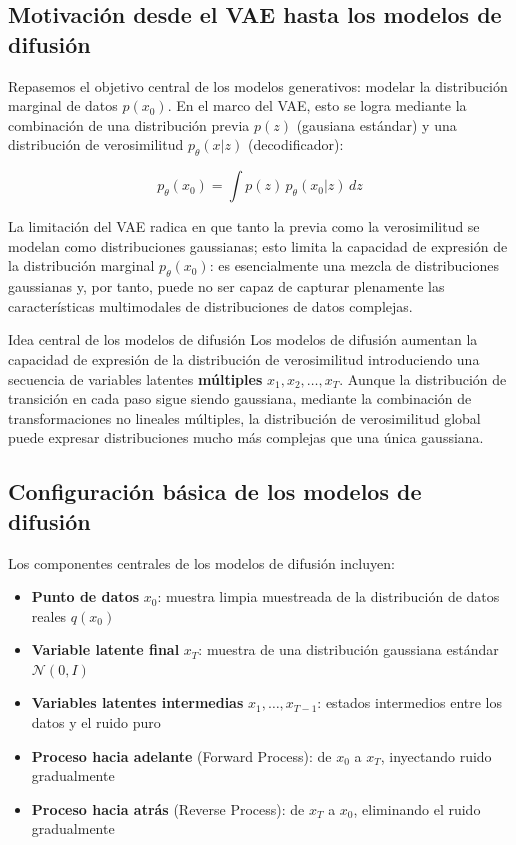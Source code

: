 \documentclass[a4paper]{article}
\begin{document}
\subsection{Motivación desde el VAE hasta los modelos de difusión}

Repasemos el objetivo central de los modelos generativos: modelar la distribución marginal de datos $p(x_0)$. En el marco del VAE, esto se logra mediante la combinación de una distribución previa $p(z)$ (gausiana estándar) y una distribución de verosimilitud $p_\theta(x|z)$ (decodificador):

$$p_\theta(x_0) = \int p(z) \, p_\theta(x_0 | z) \, dz$$

La limitación del VAE radica en que tanto la previa como la verosimilitud se modelan como distribuciones gaussianas; esto limita la capacidad de expresión de la distribución marginal $p_\theta(x_0)$: es esencialmente una mezcla de distribuciones gaussianas y, por tanto, puede no ser capaz de capturar plenamente las características multimodales de distribuciones de datos complejas.

\begin{importantbox}{Idea central de los modelos de difusión}
Los modelos de difusión aumentan la capacidad de expresión de la distribución de verosimilitud introduciendo una secuencia de variables latentes \textbf{múltiples} $x_1, x_2, \dots, x_T$. Aunque la distribución de transición en cada paso sigue siendo gaussiana, mediante la combinación de transformaciones no lineales múltiples, la distribución de verosimilitud global puede expresar distribuciones mucho más complejas que una única gaussiana.
\end{importantbox}

\subsection{Configuración básica de los modelos de difusión}

Los componentes centrales de los modelos de difusión incluyen:

\begin{itemize}
    \item \textbf{Punto de datos} $x_0$: muestra limpia muestreada de la distribución de datos reales $q(x_0)$
    \item \textbf{Variable latente final} $x_T$: muestra de una distribución gaussiana estándar $\mathcal{N}(0, I)$
    \item \textbf{Variables latentes intermedias} $x_1, \dots, x_{T-1}$: estados intermedios entre los datos y el ruido puro
    \item \textbf{Proceso hacia adelante} (Forward Process): de $x_0$ a $x_T$, inyectando ruido gradualmente
    \item \textbf{Proceso hacia atrás} (Reverse Process): de $x_T$ a $x_0$, eliminando el ruido gradualmente
\end{itemize}
\end{document}

